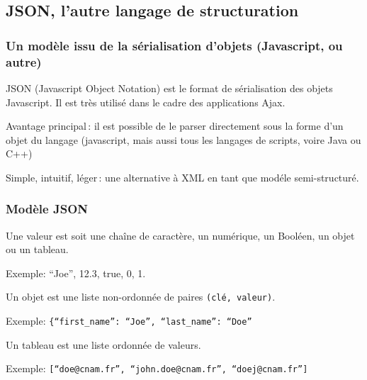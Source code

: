 \subsection{JSON, l'autre langage de structuration}


\begin{frame}
\frametitle{Un modèle issu de la sérialisation d'objets (Javascript,
ou autre)}

JSON (Javascript Object Notation) est le format de sérialisation des objets
Javascript. Il est très utilisé dans le cadre des applications Ajax.

\vfill

Avantage principal\,: il est possible de le parser directement sous la forme
d'un objet du langage (javascript, mais aussi tous les langages de scripts,
voire Java ou C++)

\vfill

Simple, intuitif, léger\,: une alternative à XML en tant que modéle
semi-structuré.
\end{frame}


\begin{frame}
\frametitle{Modèle JSON}

Une \alert{valeur} est soit une chaîne de caractère, un numérique, un Booléen,
un \alert{objet} ou un \alert{tableau}.

\smallskip

Exemple: ``Joe'', 12.3, true, 0, 1.

\vfill

Un \alert{objet} est une liste non-ordonnée de paires \texttt{(clé, valeur)}.

\smallskip

Exemple: \texttt{\{``first\_name'': ``Joe'', ``last\_name'': ``Doe''}

\vfill

Un \alert{tableau} est une liste ordonnée de valeurs. 

\smallskip

Exemple: \texttt{[``doe@cnam.fr'', ``john.doe@cnam.fr'', ``doej@cnam.fr'']}

\end{frame}


